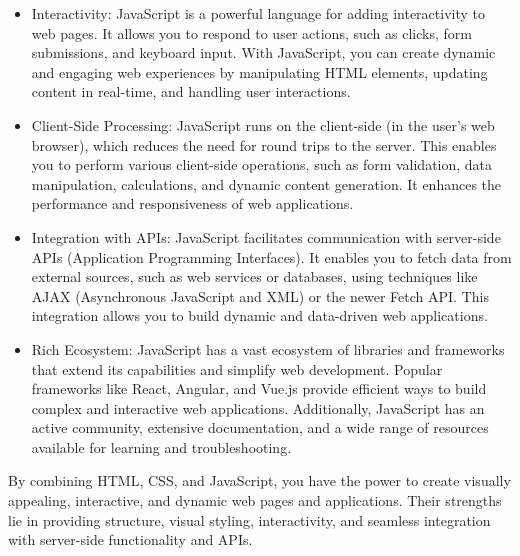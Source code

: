 \documentclass[a4paper, 11pt]{report}
\begin{document}
\begin{itemize}
\item 	Interactivity: JavaScript is a powerful language for adding interactivity to web pages. It allows you to respond to user actions, such as clicks, form submissions, and keyboard input. With JavaScript, you can create dynamic and engaging web experiences by manipulating HTML elements, updating content in real-time, and handling user interactions.
\item 	Client-Side Processing: JavaScript runs on the client-side (in the user's web browser), which reduces the need for round trips to the server. This enables you to perform various client-side operations, such as form validation, data manipulation, calculations, and dynamic content generation. It enhances the performance and responsiveness of web applications.
\item 	Integration with APIs: JavaScript facilitates communication with server-side APIs (Application Programming Interfaces). It enables you to fetch data from external sources, such as web services or databases, using techniques like AJAX (Asynchronous JavaScript and XML) or the newer Fetch API. This integration allows you to build dynamic and data-driven web applications.
\item 	Rich Ecosystem: JavaScript has a vast ecosystem of libraries and frameworks that extend its capabilities and simplify web development. Popular frameworks like React, Angular, and Vue.js provide efficient ways to build complex and interactive web applications. Additionally, JavaScript has an active community, extensive documentation, and a wide range of resources available for learning and troubleshooting.
\end{itemize}
By combining HTML, CSS, and JavaScript, you have the power to create visually appealing, interactive, and dynamic web pages and applications. Their strengths lie in providing structure, visual styling, interactivity, and seamless integration with server-side functionality and APIs.
\end{document}
